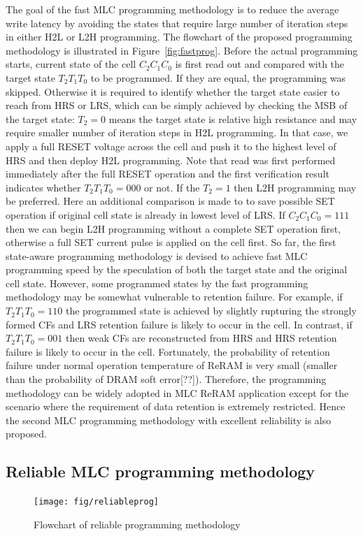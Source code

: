 The goal of the fast MLC programming methodology is to reduce the average write latency by avoiding the states that require large number of iteration steps in either H2L or L2H programming. The flowchart of the proposed programming methodology is illustrated in Figure~\ref{fig:fastprog}. Before the actual programming starts, current state of the cell $C_2C_1C_0$ is first read out and compared with the target state $T_2T_1T_0$ to be programmed. If they are equal, the programming was skipped. Otherwise it is required to identify whether the target state easier to reach from HRS or LRS, which can be simply achieved by checking the MSB of the target state: $T_2=0$ means the target state is relative high resistance and may require smaller number of iteration steps in H2L programming. In that case, we apply a full RESET voltage across the cell and push it to the highest level of HRS and then deploy H2L programming. Note that read was first performed immediately after the full RESET operation and the first verification result indicates whether $T_2T_1T_0=000$ or not. If the $T_2=1$ then L2H programming may be preferred. Here an additional comparison is made to to save possible SET operation if original cell state is already in lowest level of LRS. If $C_2C_1C_0=111$ then we can begin L2H programming without a complete SET operation first, otherwise a full SET current pulse is applied on the cell first. So far, the first state-aware programming methodology is devised to achieve fast MLC programming speed by the speculation of both the target state and the original cell state. However, some programmed states by the fast programming methodology may be somewhat vulnerable to retention failure. For example, if $T_2T_1T_0=110$ the programmed state is achieved by slightly rupturing the strongly formed CFs and LRS retention failure is likely to occur in the cell. In contrast, if $T_2T_1T_0=001$ then weak CFs are reconstructed from HRS and HRS retention failure is likely to occur in the cell. Fortunately, the probability of retention failure under normal operation temperature of ReRAM is very small (smaller than the probability of DRAM soft error[??]). Therefore, the programming methodology can be widely adopted in MLC ReRAM application except for the scenario where the requirement of data retention is extremely restricted. Hence the second MLC programming methodology with excellent reliability is also proposed.

\subsection{Reliable MLC programming methodology}
\begin{figure}[t]
\centering
\texttt{[image: fig/reliableprog]}
\vspace{-10pt}
\caption{Flowchart of reliable programming methodology}
\label{fig:reliableprog}
\vspace{-15pt}
\end{figure}

